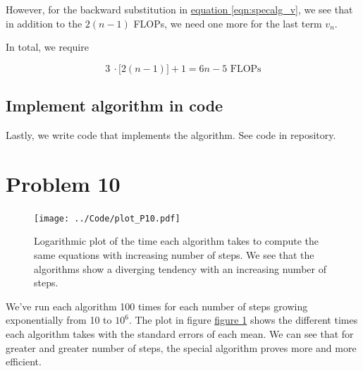 \documentclass[english,notitlepage]{article}  %
\begin{document}
    However, for the backward substitution in \hyperref[eqn:specalg_v]{equation \ref*{eqn:specalg_v}}, we see that in addition to the $2(n-1)$ FLOPs, we need one more for the last term $v_n$.

    In total, we require

    \begin{equation}
      3 ~ \cdotp \big[ 2(n-1)\big] + 1 = 6n-5 \text{ FLOPs}
    \end{equation}

    \subsection*{Implement algorithm in code}

    Lastly, we write code that implements the algorithm. See code in repository.

\section*{Problem 10}
    
\begin{figure}[H]
  \begin{center}
    \texttt{[image: ../Code/plot\_P10.pdf]}
    \caption{Logarithmic plot of the time each algorithm takes to compute the same equations with increasing number of steps. We see that the algorithms show a diverging tendency with an increasing number of steps.}
    \label{fig:P10}
  \end{center}
\end{figure}

We've run each algorithm 100 times for each number of steps growing exponentially from 10 to $10^6$. The plot in figure \hyperref[fig:P10]{figure \ref*{fig:P10}} shows the different times each algorithm takes with the standard errors of each mean. We can see that for greater and greater number of steps, the special algorithm proves more and more efficient.
\end{document}
